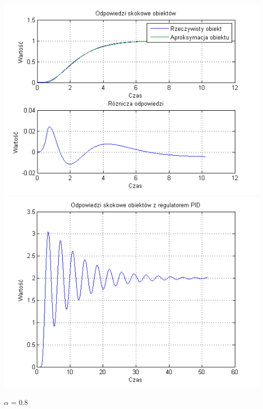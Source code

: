 \documentclass[10pt,a4paper]{article}
\begin{document}
\begin{center}
\includegraphics[scale=1]{images/dwa/skrypt_129.png}\\
\includegraphics[scale=1]{images/dwa/skrypt_130.png}\\
\end{center}
\newpage
$\alpha$ = 0.8
\end{document}
